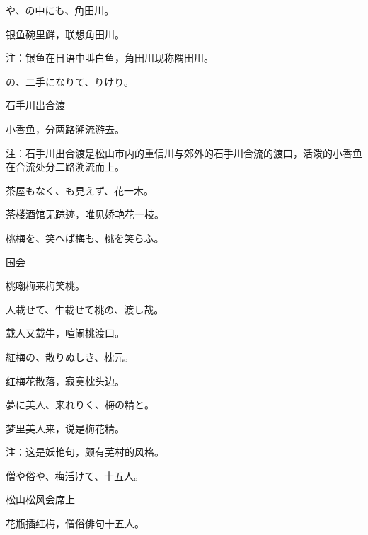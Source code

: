 \begin{haiku}
    {\FH {}や、の中にも、角田川。}

    {\FK 银鱼碗里鲜，联想角田川。}

    {\FT 注：银鱼在日语中叫白鱼，角田川现称隅田川。}
\end{haiku}

\begin{haiku}
    {\FH {}の、二手になりて、りけり。}

    {\FK 石手川出合渡}

    {\FK 小香鱼，分两路溯流游去。}

    {\FT 注：石手川出合渡是松山市内的重信川与郊外的石手川合流的渡口，活泼的小香鱼在合流处分二路溯流而上。}
\end{haiku}

\begin{haiku}
    {\FH 茶屋もなく、も見えず、花一木。}

    {\FK 茶楼酒馆无踪迹，唯见娇艳花一枝。}
\end{haiku}

\begin{haiku}
    {\FH 桃梅を、笑へば梅も、桃を笑らふ。}

    {\FK 国会}

    {\FK 桃嘲梅来梅笑桃。}
\end{haiku}

\begin{haiku}
    {\FH 人載せて、牛載せて桃の、渡し哉。}

    {\FK 载人又载牛，喧闹桃渡口。}
\end{haiku}

\begin{haiku}
    {\FH 紅梅の、散りぬしき、枕元。}

    {\FK 红梅花散落，寂寞枕头边。}
\end{haiku}

\begin{haiku}
    {\FH 夢に美人、来れりく、梅の精と。}

    {\FK 梦里美人来，说是梅花精。}

    {\FT 注：这是妖艳句，颇有芜村的风格。}
\end{haiku}

\begin{haiku}
    {\FH 僧や俗や、梅活けて、十五人。}

    {\FK 松山松风会席上}

    {\FK 花瓶插红梅，僧俗俳句十五人。}
\end{haiku}

